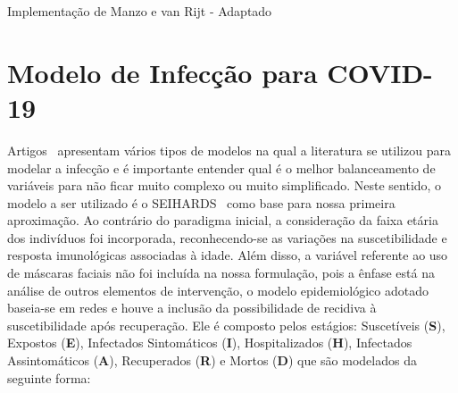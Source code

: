 \begin{algorithm}[htbp]
   \caption{Implementação de Manzo e van Rijt - Adaptado}
   \label{alg:MCP_MANZO}


\end{algorithm}

\section{Modelo de Infecção para COVID-19}

Artigos~\cite{Liu2022,Xiang2021} apresentam vários tipos de modelos na qual a literatura se utilizou para modelar a infecção e é importante entender qual é o melhor balanceamento de variáveis para não ficar muito complexo ou muito simplificado. Neste sentido, o modelo a ser utilizado é o 
SEIHARDS~\cite{Eikenberry2020} como base para nossa primeira aproximação. Ao contrário do paradigma inicial, a consideração da faixa etária dos indivíduos foi incorporada, reconhecendo-se as variações na suscetibilidade e resposta imunológicas associadas à idade. Além disso, a variável referente ao uso de máscaras faciais não foi incluída na nossa formulação, pois a ênfase está na análise de outros elementos de intervenção, o modelo epidemiológico adotado baseia-se em redes e houve a inclusão da possibilidade de recidiva à suscetibilidade após recuperação. Ele é composto pelos estágios: Suscetíveis (\textbf{S}), Expostos (\textbf{E}), Infectados Sintomáticos (\textbf{I}), Hospitalizados (\textbf{H}), Infectados Assintomáticos (\textbf{A}), Recuperados (\textbf{R}) e Mortos (\textbf{D}) que são modelados da seguinte forma:

